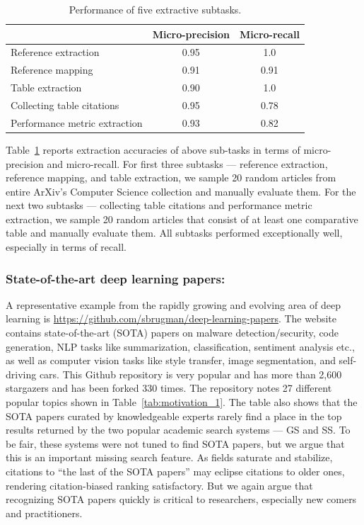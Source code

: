 \documentclass[runningheads]{llncs}
\begin{document}
\begin{table}[ht]
  \caption{Performance of five extractive subtasks.} 
  \label{tab:extraction_evaluation}
\centering
  \begin{tabular}{lcc} \toprule
  &Micro-precision &Micro-recall\\ \midrule
  Reference extraction & 0.95 &1.0\\ 
  Reference mapping & 0.91 &0.91\\ 
  Table extraction&  0.90 &1.0\\
  Collecting table citations & 0.95 &0.78\\
  Performance metric extraction & 0.93  &0.82\\  
  \bottomrule \hline
 \end{tabular}
\end{table}

Table~\ref{tab:extraction_evaluation} reports extraction accuracies of above sub-tasks in terms of micro-precision and micro-recall. For first three subtasks --- reference extraction, reference mapping, and table extraction, we sample 20 random articles from entire ArXiv's Computer Science collection and manually evaluate them. For the next two subtasks --- collecting table citations and performance metric extraction, we sample 20 random articles that consist of at least one comparative table and manually evaluate them. All subtasks performed exceptionally well, especially in terms of recall.
\fi


\subsubsection{State-of-the-art deep learning  papers:}
A representative example from the rapidly growing and evolving area of deep learning is {\small \url{https://github.com/sbrugman/deep-learning-papers}}. The website contains state-of-the-art (SOTA) papers on malware detection/security, code generation, NLP tasks like summarization, classification, sentiment analysis etc., as well as computer vision tasks like style transfer, image segmentation, and self-driving cars. This Github repository is very popular and has more than 2,600 stargazers and has been forked 330 times. The repository notes 27 different popular topics shown in Table~\ref{tab:motivation_1}. The table also shows that the SOTA papers curated by knowledgeable experts rarely find a place in the top results returned by the two popular academic search systems --- GS and SS.  To be fair, these systems were not tuned to find SOTA papers, but we argue that this is an important missing search feature.  As fields saturate and stabilize, citations to ``the last of the SOTA papers'' may eclipse citations to older ones, rendering citation-biased ranking satisfactory.  But we again argue that recognizing SOTA papers quickly is critical to researchers, especially new comers and practitioners.
\end{document}
